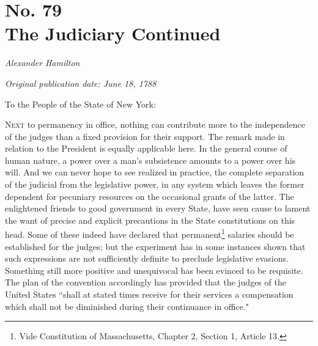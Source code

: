 \chapter[No. 79: The Judiciary Continued]{No. 79\\ {\small The Judiciary Continued}}

\textit{Alexander Hamilton}

\textit{Original publication date: June 18, 1788}
\vspace{1cm}

To the People of the State of New York:
\vspace{.4cm}

\textsc{Next} to permanency in office, nothing can contribute more to the independence of the judges than a fixed provision for their support. 
The remark made in relation to the President is equally applicable here. 
In the general course of human nature, a power over a man's subsistence amounts to a power over his will. 
And we can never hope to see realized in practice, the complete separation of the judicial from the legislative power, in any system which leaves the former dependent for pecuniary resources on the occasional grants of the latter. 
The enlightened friends to good government in every State, have seen cause to lament the want of precise and explicit precautions in the State constitutions on this head. 
Some of these indeed have declared that permanent\footnote{Vide Constitution of Massachusetts, Chapter 2, Section 1, Article 13.} salaries should be established for the judges; but the experiment has in some instances shown that such expressions are not sufficiently definite to preclude legislative evasions. 
Something still more positive and unequivocal has been evinced to be requisite. 
The plan of the convention accordingly has provided that the judges of the United States ``shall at stated times receive for their services a compensation which shall not be diminished during their continuance in office."

